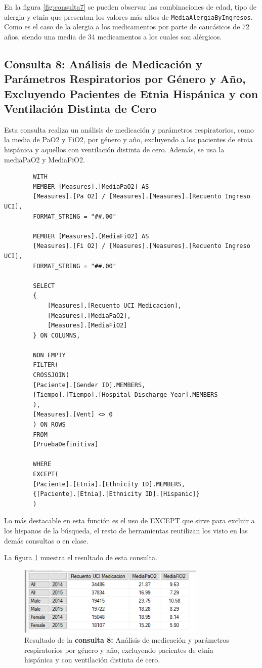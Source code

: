 \documentclass[12pt, a4paper, twoside]{article}
\begin{document}
	En la figura \ref{fig:consulta7} se pueden observar las combinaciones de edad, tipo de alergia y etnia que presentan los valores más altos de \texttt{MediaAlergiaByIngresos}. Como es el caso de la alergia a los medicamentos por parte de caucásicos de 72 años, siendo una media de 34 medicamentos a los cuales son alérgicos. 
		
	\subsection{Consulta 8: Análisis de Medicación y Parámetros Respiratorios por Género y Año, Excluyendo Pacientes de Etnia Hispánica y con Ventilación Distinta de Cero}
	
	Esta consulta realiza un análisis de medicación y parámetros respiratorios, como la media de PaO2 y FiO2, por género y año, excluyendo a los pacientes de etnia hispánica y aquellos con ventilación distinta de cero. Además, se usa la mediaPaO2 y MediaFiO2.
	
	\begin{verbatim}
		WITH 
		MEMBER [Measures].[MediaPaO2] AS
		[Measures].[Pa O2] / [Measures].[Measures].[Recuento Ingreso UCI],
		FORMAT_STRING = "##.00"
		
		MEMBER [Measures].[MediaFiO2] AS
		[Measures].[Fi O2] / [Measures].[Measures].[Recuento Ingreso UCI],
		FORMAT_STRING = "##.00"
		
		SELECT 
		{ 
			[Measures].[Recuento UCI Medicacion],
			[Measures].[MediaPaO2],
			[Measures].[MediaFiO2]
		} ON COLUMNS,
		
		NON EMPTY 
		FILTER(
		CROSSJOIN(
		[Paciente].[Gender ID].MEMBERS,
		[Tiempo].[Tiempo].[Hospital Discharge Year].MEMBERS 
		),
		[Measures].[Vent] <> 0
		) ON ROWS
		FROM 
		[PruebaDefinitiva]
		
		WHERE 
		EXCEPT(
		[Paciente].[Etnia].[Ethnicity ID].MEMBERS,
		{[Paciente].[Etnia].[Ethnicity ID].[Hispanic]}
		)
	\end{verbatim}
	
	Lo más destacable en esta función es el uso de EXCEPT que sirve para excluir a los hispanos de la búsqueda, el resto de herramientas reutilizan los visto en las demás consultas o en clase.
	
	La figura \ref{fig:consulta8} muestra el resultado de esta consulta.
	
	\begin{figure}[H]
		\centering
		\includegraphics[width=0.8\textwidth]{image/consulta8.png}
		\caption{Resultado de la \textbf{consulta 8:} Análisis de medicación y parámetros respiratorios por género y año, excluyendo pacientes de etnia hispánica y con ventilación distinta de cero.}
		\label{fig:consulta8}
	\end{figure}
	
\end{document}

